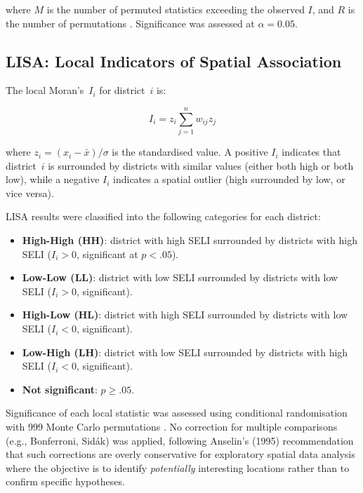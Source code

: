 \documentclass[12pt,a4paper,twoside]{article}
\begin{document}
where $M$ is the number of permuted statistics exceeding the observed $I$, and
$R$ is the number of permutations \citep{anselin1995lisa}. Significance was
assessed at $\alpha = 0.05$.

\subsection{LISA: Local Indicators of Spatial Association}

The local Moran's~$I_i$ for district~$i$ is:

\begin{equation}\label{eq:lisa}
  I_i = z_i \sum_{j=1}^{n} w_{ij} z_j
\end{equation}

where $z_i = (x_i - \bar{x}) / \sigma$ is the standardised value. A positive
$I_i$ indicates that district~$i$ is surrounded by districts with similar values
(either both high or both low), while a negative $I_i$ indicates a spatial
outlier (high surrounded by low, or vice versa).

LISA results were classified into the following categories for each district:
\begin{itemize}
  \item \textbf{High-High (HH)}: district with high SELI surrounded by districts
        with high SELI ($I_i > 0$, significant at $p < .05$).
  \item \textbf{Low-Low (LL)}: district with low SELI surrounded by districts
        with low SELI ($I_i > 0$, significant).
  \item \textbf{High-Low (HL)}: district with high SELI surrounded by districts
        with low SELI ($I_i < 0$, significant).
  \item \textbf{Low-High (LH)}: district with low SELI surrounded by districts
        with high SELI ($I_i < 0$, significant).
  \item \textbf{Not significant}: $p \geq .05$.
\end{itemize}

Significance of each local statistic was assessed using conditional randomisation
with 999 Monte Carlo permutations \citep{anselin1995lisa}. No correction for
multiple comparisons (e.g., Bonferroni, Sidák) was applied, following Anselin's
(1995) recommendation that such corrections are overly conservative for exploratory
spatial data analysis where the objective is to identify \textit{potentially}
interesting locations rather than to confirm specific hypotheses.
\end{document}
